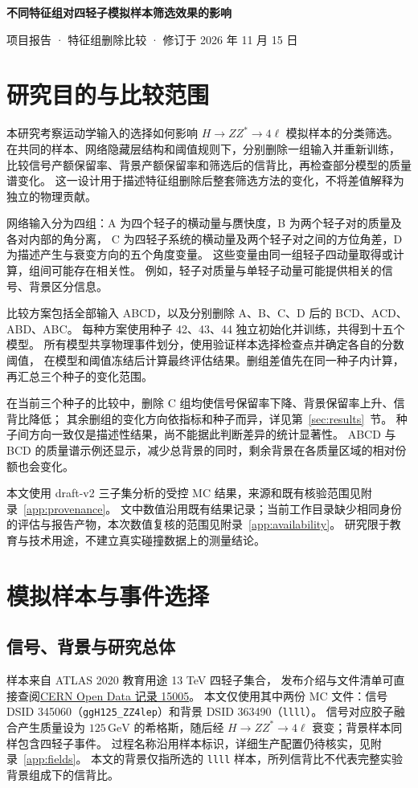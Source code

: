 \documentclass[11pt,a4paper,fontset=fandol,scheme=plain]{ctexart}
\newcommand{\gev}{\,\mathrm{GeV}}
\begin{document}
{\LARGE\bfseries\color{reportblue} 不同特征组对四轻子模拟样本筛选效果的影响\par}
\vspace{6pt}
项目报告 · 特征组删除比较 · 修订于 2026 年 11 月 15 日


\section{研究目的与比较范围}

本研究考察运动学输入的选择如何影响 $H\to ZZ^*\to4\ell$ 模拟样本的分类筛选。
在共同的样本、网络隐藏层结构和阈值规则下，分别删除一组输入并重新训练，
比较信号产额保留率、背景产额保留率和筛选后的信背比，再检查部分模型的质量谱变化。
这一设计用于描述特征组删除后整套筛选方法的变化，不将差值解释为独立的物理贡献。

网络输入分为四组：A 为四个轻子的横动量与赝快度，B 为两个轻子对的质量及各对内部的角分离，
C 为四轻子系统的横动量及两个轻子对之间的方位角差，D 为描述产生与衰变方向的五个角度变量。
这些变量由同一组轻子四动量取得或计算，组间可能存在相关性。
例如，轻子对质量与单轻子动量可能提供相关的信号、背景区分信息。

比较方案包括全部输入 ABCD，以及分别删除 A、B、C、D 后的 BCD、ACD、ABD、ABC。
每种方案使用种子 42、43、44 独立初始化并训练，共得到十五个模型。
所有模型共享物理事件划分，使用验证样本选择检查点并确定各自的分数阈值，
在模型和阈值冻结后计算最终评估结果。删组差值先在同一种子内计算，再汇总三个种子的变化范围。

在当前三个种子的比较中，删除 C 组均使信号保留率下降、背景保留率上升、信背比降低；
其余删组的变化方向依指标和种子而异，详见第~\ref{sec:results}~节。
种子间方向一致仅是描述性结果，尚不能据此判断差异的统计显著性。
ABCD 与 BCD 的质量谱示例还显示，减少总背景的同时，剩余背景在各质量区域的相对份额也会变化。

本文使用 draft-v2 三子集分析的受控 MC 结果，来源和既有核验范围见附录~\ref{app:provenance}。
文中数值沿用既有结果记录；当前工作目录缺少相同身份的评估与报告产物，本次数值复核的范围见附录~\ref{app:availability}。
研究限于教育与技术用途，不建立真实碰撞数据上的测量结论。

\section{模拟样本与事件选择}


\subsection{信号、背景与研究总体}
样本来自 ATLAS 2020 教育用途 13 TeV 四轻子集合\cite{OpenData}，
发布介绍与文件清单可直接查阅\href{https://opendata.cern.ch/record/15005}{CERN Open Data 记录 15005}。
本文仅使用其中两份 MC 文件：信号 DSID 345060（\texttt{ggH125\_ZZ4lep}）和背景 DSID 363490（\texttt{llll}）。
信号对应胶子融合产生质量设为 $125\gev$ 的希格斯，随后经 $H\to ZZ^*\to4\ell$ 衰变；背景样本同样包含四轻子事件。
过程名称沿用样本标识，详细生产配置仍待核实，见附录~\ref{app:fields}。
本文的背景仅指所选的 \texttt{llll} 样本，所列信背比不代表完整实验背景组成下的信背比。
\end{document}
